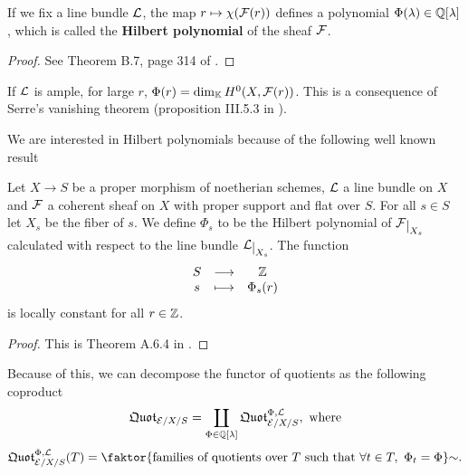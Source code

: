 \begin{theorem}
If we fix a line bundle $\mathcal{L}$, the map $r\mapsto \chi(\mathcal{F}(r))$ defines a polynomial $\Phi(\lambda)\in\mathbb{Q}[\lambda]$, which is called the \textbf{Hilbert polynomial} of the sheaf $\mathcal{F}$.
\end{theorem}
\begin{proof}
See Theorem B.7, page 314 of \cite{FGAEXPLAINED}.
\end{proof}

\begin{remark}\label{HilbertoPolynomialGivesDimentionForLargeInput}
If $\mathcal{L}$ is ample, for large $r$, $\Phi(r)=\dim_{\mathbb{K}} H^0(X,\mathcal{F}(r))$. This is a consequence of Serre's vanishing theorem (proposition {\rm III}.5.3 in \cite{Hartshorne}).
\end{remark}

We are interested in Hilbert polynomials because of the following well known result 

\begin{theorem}\label{SemicontinuityTheorem}
Let $X\to S$ be a proper morphism of noetherian schemes, $\mathcal{L}$ a line bundle on $X$ and $\mathcal{F}$ a coherent sheaf on $X$ with proper support and flat over $S$. For all $s\in S$ let $X_s$ be the fiber of $s$. We define $\Phi_s$ to be the Hilbert polynomial of $\Fc\res{X_s}$ calculated with respect to the line bundle $\Lc\res{X_s}$. The function
\[\begin{array}{ccc} {S} & \longrightarrow & {\mathbb{Z}}\\ {s} & \longmapsto & {\Phi_s(r)} \end{array}\]
is locally constant for all $r\in\mathbb{Z}$.
\end{theorem}
\begin{proof}
This is Theorem A.6.4 in \cite{Alper}.
\end{proof}

Because of this, we can decompose the functor of quotients as the following coproduct
\[\mathfrak{Quot}_{\mathcal{E}/X/S}=\coprod_{\Phi\in\mathbb{Q}[\lambda]}\mathfrak{Quot}^{\Phi,\mathcal{L}}_{\mathcal{E}/X/S},\text{ where}\]
\[\quotf^{\Phi,\Lc}_{\Ec/X/S}(T)=\quot{\cpa{\text{families of quotients over $T$ such that $\forall t\in T,\ \Phi_t=\Phi$}}}\sim.\]

